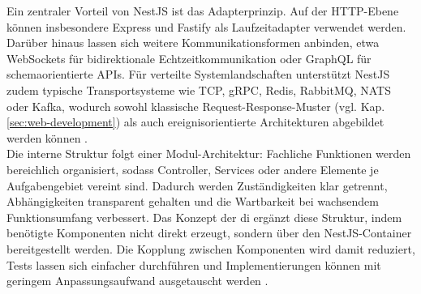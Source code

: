 Ein zentraler Vorteil von NestJS ist das Adapterprinzip. Auf der HTTP-Ebene können insbesondere Express und Fastify als Laufzeitadapter verwendet werden.
Darüber hinaus lassen sich weitere Kommunikationsformen anbinden, etwa WebSockets für bidirektionale Echtzeitkommunikation oder GraphQL für schemaorientierte APIs.
Für verteilte Systemlandschaften unterstützt NestJS zudem typische Transportsysteme wie TCP, gRPC, Redis, RabbitMQ, NATS oder Kafka, wodurch sowohl klassische Request-Response-Muster (vgl. Kap. \ref{sec:web-development}) als auch ereignisorientierte Architekturen abgebildet werden können \cite{nestjsUnknownDocumentation}. \\

Die interne Struktur folgt einer Modul-Architektur: Fachliche Funktionen werden bereichlich organisiert, sodass Controller, Services oder andere Elemente je Aufgabengebiet vereint sind.
Dadurch werden Zuständigkeiten klar getrennt, Abhängigkeiten transparent gehalten und die Wartbarkeit bei wachsendem Funktionsumfang verbessert.
Das Konzept der \gls{di} ergänzt diese Struktur, indem benötigte Komponenten nicht direkt erzeugt, sondern über den NestJS-Container bereitgestellt werden.
Die Kopplung zwischen Komponenten wird damit reduziert, Tests lassen sich einfacher durchführen und Implementierungen können mit geringem Anpassungsaufwand ausgetauscht werden \cite{nestjsUnknownDocumentation}. \\


